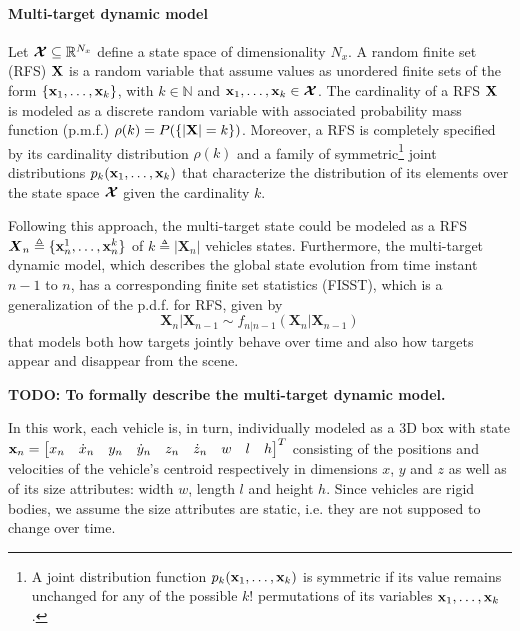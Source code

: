 \documentclass[letterpaper]{article}
\begin{document}
\paragraph{Multi-target dynamic model} Let $ \boldsymbol{\cal X} \subseteq \mathbb{R}^{N_{x}} $ define a state space of dimensionality $ N_{x} $. A random finite set (RFS) $ {\bf X} $ is a random variable that assume values as unordered finite sets of the form $ \lbrace {\bf x}_{1},\ldots,{\bf x}_{k} \rbrace $, with $ k \in \mathbb{N} $ and $ {\bf x}_{1},\ldots,{\bf x}_{k} \in \boldsymbol{\cal X} $. The cardinality of a RFS $ {\bf X} $ is modeled as a discrete random variable with associated probability mass function (p.m.f.) $ \rho(k) = P(\lbrace | {\bf X} | = k \rbrace) $. Moreover, a RFS is completely specified by its cardinality distribution $ \rho(k) $ and a family of symmetric\footnote{A joint distribution function $ p_{k}({\bf x}_{1}, \ldots, {\bf x}_{k}) $ is symmetric if its value remains unchanged for any of the possible $ k ! $ permutations of its variables $ {\bf x}_{1},\ldots,{\bf x}_{k} $.} joint distributions $ p_{k}({\bf x}_{1}, \ldots, {\bf x}_{k}) $ that characterize the distribution of its elements over the state space $ \boldsymbol{\cal X} $ given the cardinality $ k $.

Following this approach, the multi-target state could be modeled as a RFS $ \boldsymbol{X}_{n} \triangleq \lbrace {\bf x}^{1}_{n}, \ldots, {\bf x}^{k}_{n} \rbrace $ of $ k \triangleq | \boldsymbol{X}_{n} | $ vehicles states. Furthermore, the multi-target dynamic model, which describes the global state evolution from time instant $ n-1 $ to $ n $, has a corresponding finite set statistics (FISST), which is a generalization of the p.d.f. for RFS, given by
\begin{equation}
\boldsymbol{X}_{n} | \boldsymbol{X}_{n-1} \sim f_{n|n-1}(\boldsymbol{X}_{n} | \boldsymbol{X}_{n-1})
\end{equation}
\noindent that models both how targets jointly behave over time and also how targets appear and disappear from the scene.

{\bf TODO: To formally describe the multi-target dynamic model.}

In this work, each vehicle is, in turn, individually modeled as a 3D box with state $ {\bf x}_{n} = \begin{bmatrix} x_{n} & \dot{x}_{n} & y_{n} & \dot{y}_{n} & z_{n} & \dot{z}_{n} & w & l & h \end{bmatrix}^{T} $ consisting of the positions and velocities of the vehicle's centroid respectively in dimensions $ x $, $ y $ and $ z $ as well as of its size attributes: width $ w $, length $ l $ and height $ h $. Since vehicles are rigid bodies, we assume the size attributes are static, i.e. they are not supposed to change over time.
\end{document}
